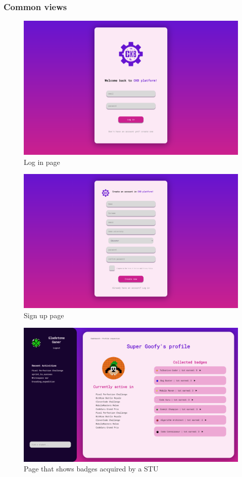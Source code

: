 \subsubsection*{Common views}
\begin{figure}[H]
    \centering
    \includegraphics[width=.9\textwidth]{images/user_interfaces/log_in.png}
    \caption{Log in page}
\end{figure}
\begin{figure}[H]
    \centering
    \includegraphics[width=.9\textwidth]{images/user_interfaces/sign_up.png}
    \caption{Sign up page}
\end{figure}
\begin{figure}[H]
    \centering
    \includegraphics[width=.9\textwidth]{images/user_interfaces/profile.png}
    \caption{Page that shows badges acquired by a STU}
\end{figure}

